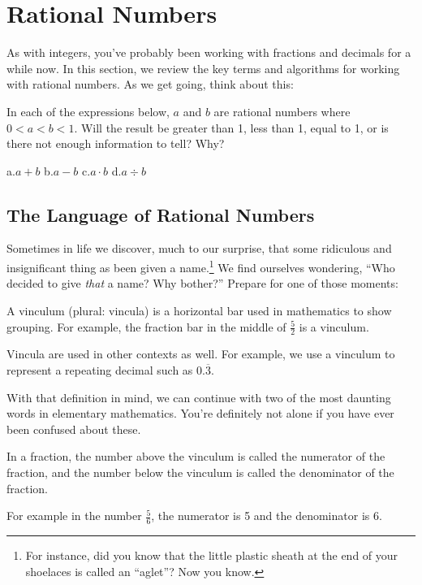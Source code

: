 \section{Rational Numbers}
\label{sec:rationals}

As with integers, you've probably been working with fractions and decimals for a while now. In this section, we review the key terms and algorithms for working with rational numbers. As we get going, think about this:

\begin{boxedexplore}
In each of the expressions below, $a$ and $b$ are rational numbers where $0 < a < b < 1$. Will the result be greater than 1, less than 1, equal to 1, or is there not enough information to tell? Why?

a.\quad $a+b$
\hfill
b.\quad $a-b$
\hfill
c.\quad $a \cdot b$
\hfill
d.\quad $a \div b$
\hfill
\end{boxedexplore}

\subsection{The Language of Rational Numbers}

Sometimes in life we discover, much to our surprise, that some ridiculous and insignificant thing as been given a name.\footnote{For instance, did you know that the little plastic sheath at the end of your shoelaces is called an ``aglet''? Now you know.} We find ourselves wondering, ``Who decided to give \textit{that} a name? Why bother?'' Prepare for one of those moments:

\begin{boxeddef}[Vinculum]
A \gls{vinculum} (plural: vincula) is a horizontal bar used in mathematics to show grouping. For example, the fraction bar in the middle of $\frac{5}{2}$ is a vinculum.

Vincula are used in other contexts as well. For example, we use a vinculum to represent a repeating decimal such as $0.\overline{3}$.
\end{boxeddef}

With that definition in mind, we can continue with two of the most daunting words in elementary mathematics. You're definitely not alone if you have ever been confused about these.

\begin{boxeddef}
In a fraction, the number above the vinculum is called the \gls{numerator} of the fraction, and the number below the vinculum is called the \gls{denominator} of the fraction.

For example in the number $\frac{5}{6}$, the numerator is 5 and the denominator is 6.
\end{boxeddef}

